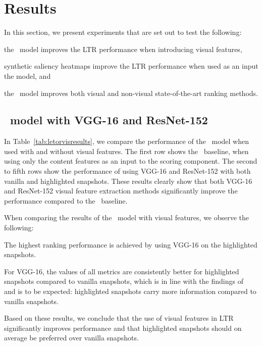 
\section{Results}
\label{sec:results}
In this section, we present experiments that are set out to test the following:
\begin{inparaenum}[(1)]
    \item the \modelname~model improves the \ac{LTR} performance when introducing visual features, 
    \item synthetic saliency heatmaps improve the \ac{LTR} performance when used as an input the \modelname{} model, and
    \item the \modelname~model improves both visual and non-visual state-of-the-art ranking methods.
\end{inparaenum}

\subsection{\modelname~model with VGG-16 and ResNet-152}
In Table~\ref{tab:letorvisresults}, we compare the performance of the \modelname~model when used with and without visual features.
The first row shows the \modelname~baseline, when using only the content features as an input to the scoring component.
The second to fifth rows show the performance of using VGG-16 and ResNet-152 with both vanilla and highlighted snapshots. 
These results clearly show that both VGG-16 and ResNet-152 visual feature extraction methods significantly improve the performance compared to the \modelname~baseline. 

When comparing the results of the \modelname~model with visual features, we observe the following:
\begin{inparaenum}[(i)]
    \item The highest ranking performance is achieved by using VGG-16 on the highlighted snapshots.
    \item For VGG-16, the values of all metrics are consistently better for highlighted snapshots compared to vanilla snapshots, which is in line with the findings of~\cite{fan2017learning} and is to be expected: highlighted snapshots carry more information compared to vanilla snapshots.
\end{inparaenum}
Based on these results, we conclude that the use of visual features in \ac{LTR} significantly improves performance
and that highlighted snapshots should on average be preferred over vanilla snapshots.


